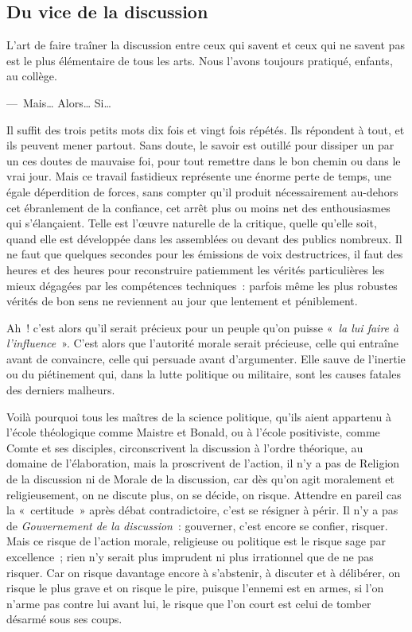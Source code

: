 \documentclass[french,twoside]{book} %
\begin{document}
\subsection[Du vice de la discussion]{Du vice de la discussion}
\noindent L’art de faire traîner la discussion entre ceux qui savent et ceux qui ne savent pas est le plus élémentaire de tous les arts. Nous l’avons toujours pratiqué, enfants, au collège.\par
— Mais… Alors… Si…\par
Il suffit des trois petits mots dix fois et vingt fois répétés. Ils répondent à tout, et ils peuvent mener partout. Sans doute, le savoir est outillé pour dissiper un par un ces doutes de mauvaise foi, pour tout remettre dans le bon chemin ou dans le vrai jour. Mais ce travail fastidieux représente une énorme perte de temps, une égale déperdition de forces, sans compter qu’il produit nécessairement au-dehors cet ébranlement de la confiance, cet arrêt plus ou moins net des enthousiasmes qui s’élançaient. Telle est l’œuvre naturelle de la critique, quelle qu’elle soit, quand elle est développée dans les assemblées ou devant des publics nombreux. Il ne faut que quelques secondes pour les émissions de voix destructrices, il faut des heures et des heures pour reconstruire patiemment les vérités particulières les mieux dégagées par les compétences techniques : parfois même les plus robustes vérités de bon sens ne reviennent au jour que lentement et péniblement.\par
Ah ! c’est alors qu’il serait précieux pour un peuple qu’on puisse « \emph{la lui faire à l’influence} ». C’est alors que l’autorité morale serait précieuse, celle qui entraîne avant de convaincre, celle qui persuade avant d’argumenter. Elle sauve de l’inertie ou du piétinement qui, dans la lutte politique ou militaire, sont les causes fatales des derniers malheurs.\par
Voilà pourquoi tous les maîtres de la science politique, qu’ils aient appartenu à l’école théologique comme Maistre et Bonald, ou à l’école positiviste, comme Comte et ses disciples, circonscrivent la discussion à l’ordre théorique, au domaine de l’élaboration, mais la proscrivent de l’action, il n’y a pas de Religion de la discussion ni de Morale de la discussion, car dès qu’on agit moralement et religieusement, on ne discute plus, on se décide, on risque. Attendre en pareil cas la « certitude » après débat contradictoire, c’est se résigner à périr. Il n’y a pas de \emph{Gouvernement de la discussion} : gouverner, c’est encore se confier, risquer. Mais ce risque de l’action morale, religieuse ou politique est le risque sage par excellence ; rien n’y serait plus imprudent ni plus irrationnel que de ne pas risquer. Car on risque davantage encore à s’abstenir, à discuter et à délibérer, on risque le plus grave et on risque le pire, puisque l’ennemi est en armes, si l’on n’arme pas contre lui avant lui, le risque que l’on court est celui de tomber désarmé sous ses coups.
\end{document}
